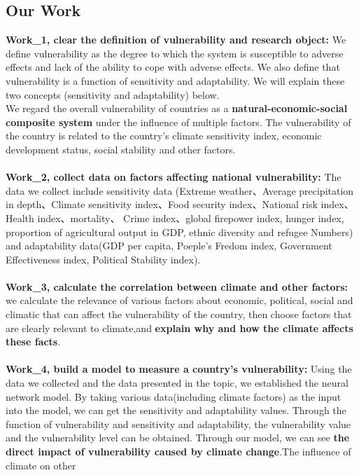 \documentclass{mcmthesis}
\begin{document}
\subsection{Our Work}
  \textbf{Work\_1, clear the definition of vulnerability and research object:} We 
  define vulnerability as the degree to which the system is susceptible to adverse effects 
  and lack of the ability to cope with adverse effects. We also define that vulnerability 
  is a function of sensitivity and adaptability. We will explain these two concepts 
  (sensitivity and adaptability) below.\\ We regard the overall vulnerability of 
  countries as a \textbf{natural-economic-social composite system} under the influence of 
  multiple factors. The vulnerability of the country is related to the country's 
  climate sensitivity index, economic development status, social stability and 
  other factors.\\\\
  \textbf{Work\_2, collect data on factors affecting national vulnerability:} The data we
  collect include sensitivity data (Extreme weather、Average precipitation in depth、Climate
  sensitivity index、Food security index、National risk index、Health index、mortality、
  Crime index、global firepower index, hunger index,  proportion of agricultural output 
  in GDP, ethnic diversity and refugee Numbers) and adaptability data(GDP per capita, 
  Poeple's Fredom index, Government Effectiveness index, Political Stability index).\\\\
  \textbf{Work\_3, calculate the correlation between climate and other factors:} we 
  calculate the relevance of various factors about economic, political, social 
  and climatic that can affect the vulnerability of the country, then choose 
  factors that are clearly relevant to climate,and \textbf{explain why and how the 
  climate affects these facts}.\\\\
  \textbf{Work\_4, build a model to measure a country's vulnerability:} Using the data 
  we collected and the data presented in the topic, we established the neural network 
  model. By taking various data(including climate factors) as the input into the model, 
  we can get the sensitivity and adaptability values. Through the function of 
  vulnerability and sensitivity and adaptability, the vulnerability value and the 
  vulnerability level can be obtained. Through our model, we can see \textbf{the direct 
  impact of vulnerability caused by climate change}.The influence of climate on other 
\end{document}
